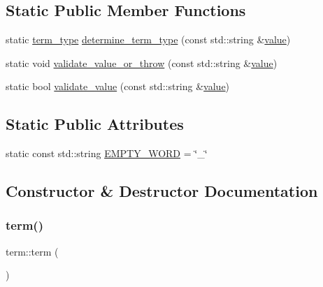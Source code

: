 \subsection*{Static Public Member Functions}
\begin{DoxyCompactItemize}
\item 
static \mbox{\hyperlink{term_8h_a01c5d13b4b82a95ffc3de77e52c7603b}{term\+\_\+type}} \mbox{\hyperlink{classterm_af5a6a6fe4fb502dbdd3ab86b7236e214}{determine\+\_\+term\+\_\+type}} (const std\+::string \&\mbox{\hyperlink{classterm_a1c1e74f49a5ed295dba144950fe779f0}{value}})
\item 
static void \mbox{\hyperlink{classterm_a8fffcf0ea764c871292f5a301e734b03}{validate\+\_\+value\+\_\+or\+\_\+throw}} (const std\+::string \&\mbox{\hyperlink{classterm_a1c1e74f49a5ed295dba144950fe779f0}{value}})
\item 
static bool \mbox{\hyperlink{classterm_aae7f7ded20c2c4ceaca14300f90bef2c}{validate\+\_\+value}} (const std\+::string \&\mbox{\hyperlink{classterm_a1c1e74f49a5ed295dba144950fe779f0}{value}})
\end{DoxyCompactItemize}
\subsection*{Static Public Attributes}
\begin{DoxyCompactItemize}
\item 
static const std\+::string \mbox{\hyperlink{classterm_a1dc39eb1e804273a4609aa4b3344e4b5}{E\+M\+P\+T\+Y\+\_\+\+W\+O\+RD}} = \char`\"{}\+\_\+\char`\"{}
\end{DoxyCompactItemize}


\subsection{Constructor \& Destructor Documentation}
\mbox{\label{classterm_ab3dfee59e9fa1b8fd77fcfd2e921c6bc}} 
\subsubsection{\texorpdfstring{term()}{term()}\hspace{0.1cm}{\footnotesize\ttfamily [1/4]}}
{\footnotesize\ttfamily term\+::term (\begin{DoxyParamCaption}{ }\end{DoxyParamCaption})\hspace{0.3cm}{\ttfamily [inline]}}

